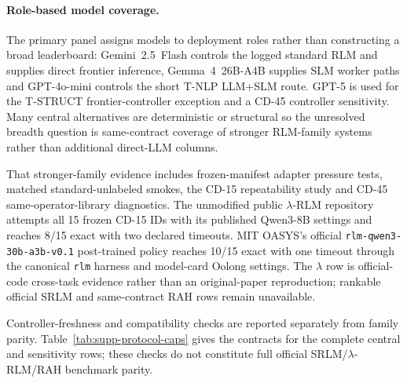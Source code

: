 \paragraph{Role-based model coverage.}
The primary panel assigns models to deployment roles rather than constructing a broad leaderboard: Gemini~2.5~Flash controls the logged standard RLM and supplies direct frontier inference, Gemma~4~26B-A4B supplies SLM worker paths and GPT-4o-mini controls the short T-NLP LLM+SLM route. GPT-5 is used for the T-STRUCT frontier-controller exception and a CD-45 controller sensitivity. Many central alternatives are deterministic or structural so the unresolved breadth question is same-contract coverage of stronger RLM-family systems rather than additional direct-LLM columns.

That stronger-family evidence includes frozen-manifest adapter pressure tests, matched standard-unlabeled smokes, the CD-15 repeatability study and CD-45 same-operator-library diagnostics. The unmodified public $\lambda$-RLM repository attempts all 15 frozen CD-15 IDs with its published Qwen3-8B settings and reaches 8/15 exact with two declared timeouts. MIT OASYS's official \texttt{rlm-qwen3-30b-a3b-v0.1} post-trained policy reaches 10/15 exact with one timeout through the canonical \texttt{rlm} harness and model-card Oolong settings. The $\lambda$ row is official-code cross-task evidence rather than an original-paper reproduction; rankable official SRLM and same-contract RAH rows remain unavailable.

Controller-freshness and compatibility checks are reported separately from family parity. Table~\ref{tab:supp-protocol-caps} gives the contracts for the complete central and sensitivity rows; these checks do not constitute full official SRLM/$\lambda$-RLM/RAH benchmark parity.

